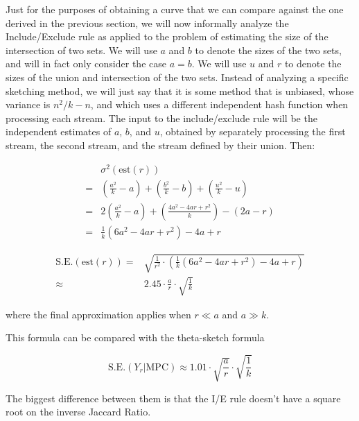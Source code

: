 \documentclass{sig-alternate}
\begin{document}
Just for the purposes of obtaining a curve that we can compare against
the one derived in the previous section, we will now informally
analyze the Include/Exclude rule as applied to the problem of
estimating the size of the intersection of two sets. We will use $a$
and $b$ to denote the sizes of the two sets, and will in fact only
consider the case $a=b$. We will use $u$ and $r$ to denote the sizes
of the union and intersection of the two sets. Instead of analyzing a
specific sketching method, we will just say that it is some method
that is unbiased, whose variance is $n^2/k - n$, and which uses a
different independent hash function when processing each stream. The
input to the include/exclude rule will be the independent estimates of
$a$, $b$, and $u$, obtained by separately processing the first stream,
the second stream, and the stream defined by their union. Then:

\begin{align}
  & \sigma^2(\mathrm{est}(r)) \\
= & \left(\frac{a^2}{k} - a\right) + 
    \left(\frac{b^2}{k} - b\right) + 
    \left(\frac{u^2}{k} - u\right) \\
= & 2 \left(\frac{a^2}{k} - a\right) + 
      \left(\frac{4a^2-4ar+r^2}{k}\right) - (2a - r) \\
= & \frac{1}{k} (6a^2-4ar+r^2) - 4a + r
\end{align}

\begin{align}
  \mathrm{S.E.}(\mathrm{est}(r)) = & \sqrt{\frac{1}{r^2} \cdot \left(\frac{1}{k} (6a^2-4ar+r^2) - 4a + r\right)} \\
                            \approx \; & 2.45 \cdot \frac{a}{r} \cdot \sqrt{\frac{1}{k}}
\end{align}

\noindent where the final approximation applies when $r \ll a$ and $a \gg k$.

This formula can be compared with the theta-sketch formula

\begin{equation}
\mathrm{S.E.}(Y_r|\mathrm{MPC}) \approx 1.01 \cdot \sqrt{\frac{a}{r}} \cdot \sqrt{\frac{1}{k}} 
\end{equation}

The biggest difference between them is that the I/E rule
doesn't have a square root on the inverse Jaccard Ratio. 
\end{document}
